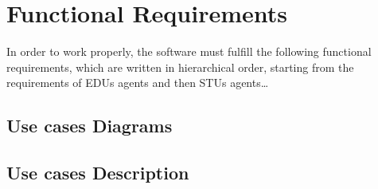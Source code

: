 \section{Functional Requirements}
In order to work properly, the software must fulfill the following functional requirements, which are written in hierarchical order, starting from the requirements of EDUs agents and then STUs agents\dots

\subsection{Use cases Diagrams}

\subsection{Use cases Description}



